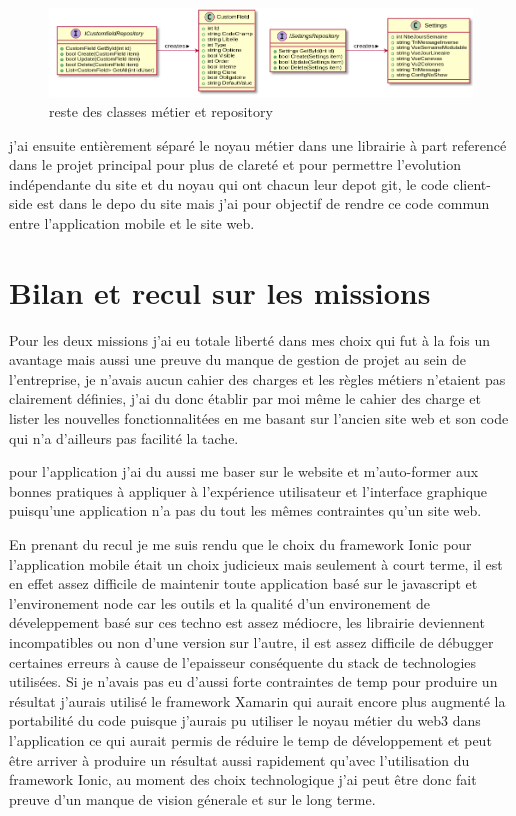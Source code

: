 \begin{figure}[h]
	\centering
	\includegraphics[width=1\linewidth]{Images/otherpersistence}
	\caption{reste des classes métier et repository}
	\label{fig:otherrepo}
\end{figure}


j'ai ensuite entièrement séparé le noyau métier dans une librairie à part referencé dans 
le projet principal pour plus de clareté et pour permettre l'evolution indépendante du site 
et du noyau qui ont chacun leur depot git, le code client-side est dans le depo du site 
mais j'ai pour objectif de rendre ce code commun entre l'application mobile et le site web.

\section{Bilan et recul sur les missions}
Pour les deux missions j'ai eu totale liberté dans mes choix qui fut à la fois un avantage mais 
aussi une preuve du manque de gestion de projet au sein de l'entreprise, je n'avais 
aucun cahier des charges et les règles métiers n'etaient pas clairement définies,
j'ai du donc établir par moi même le cahier des charge et lister les nouvelles fonctionnalitées 
en me basant sur l'ancien site web et son code qui n'a d'ailleurs pas facilité la tache. \newline

pour l'application j'ai du aussi me baser sur le website et m'auto-former aux bonnes pratiques 
à appliquer à l'expérience utilisateur et l'interface graphique puisqu'une application
n'a pas du tout les mêmes contraintes qu'un site web. \newline

En prenant du recul je me suis rendu que le choix du framework Ionic pour l'application mobile
était un choix judicieux mais seulement à court terme, il est en effet assez difficile de maintenir toute 
application basé sur le javascript et l'environement node car les outils et la qualité 
d'un environement de déveleppement basé sur ces techno est assez médiocre, les librairie 
deviennent incompatibles ou non d'une version sur l'autre, il est assez difficile 
de débugger certaines erreurs à cause de l'epaisseur conséquente du stack de technologies
utilisées. Si je n'avais pas eu d'aussi forte contraintes de temp pour produire un résultat 
j'aurais utilisé le framework Xamarin qui aurait encore plus augmenté la portabilité 
du code puisque j'aurais pu utiliser le noyau métier du web3 dans l'application
ce qui aurait permis de réduire le temp de développement et peut être arriver 
à produire un résultat aussi rapidement qu'avec l'utilisation du framework Ionic, 
au moment des choix technologique j'ai peut être donc fait preuve d'un manque de vision génerale
et sur le long terme. \newline



